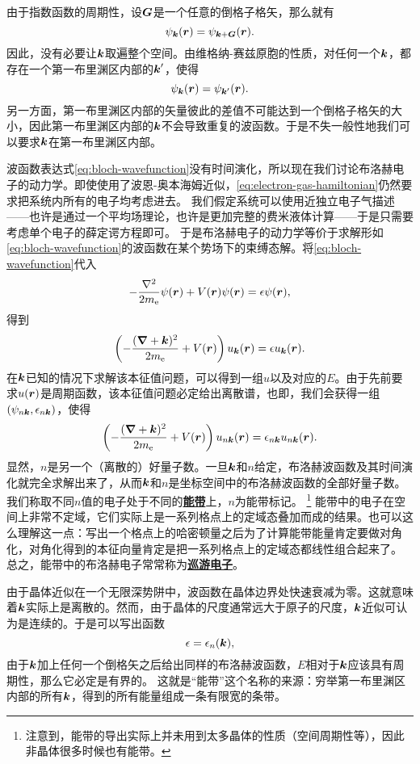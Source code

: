 \documentclass[hyperref, UTF8, a4paper]{ctexart}
\newcommand*{\concept}[1]{\underline{\textbf{#1}}}
\begin{document}
由于指数函数的周期性，设$\vb*{G}$是一个任意的倒格子格矢，那么就有
\[
    \psi_{\vb*{k}}(\vb*{r}) = \psi_{\vb*{k}+\vb*{G}}(\vb*{r}).
\]
因此，没有必要让$\vb*{k}$取遍整个空间。由维格纳-赛兹原胞的性质，对任何一个$\vb*{k}$，都存在一个第一布里渊区内部的$\vb*{k}'$，使得
\[
    \psi_{\vb*{k}}(\vb*{r}) = \psi_{\vb*{k}'}(\vb*{r}).
\]
另一方面，第一布里渊区内部的矢量彼此的差值不可能达到一个倒格子格矢的大小，因此第一布里渊区内部的$\vb*{k}$不会导致重复的波函数。于是不失一般性地我们可以要求$\vb*{k}$在第一布里渊区内部。

波函数表达式\eqref{eq:bloch-wavefunction}没有时间演化，所以现在我们讨论布洛赫电子的动力学。即使使用了波恩-奥本海姆近似，\eqref{eq:electron-gas-hamiltonian}仍然要求把系统内所有的电子均考虑进去。
我们假定系统可以使用近独立电子气描述——也许是通过一个平均场理论，也许是更加完整的费米液体计算——于是只需要考虑单个电子的薛定谔方程即可。
于是布洛赫电子的动力学等价于求解形如\eqref{eq:bloch-wavefunction}的波函数在某个势场下的束缚态解。将\eqref{eq:bloch-wavefunction}代入
\[
    -\frac{\laplacian}{2m_\text{e}} \psi(\vb*{r}) + V(\vb*{r}) \psi(\vb*{r}) = \epsilon \psi(\vb*{r}),
\]
得到
\begin{equation}
    \left( - \frac{(\grad+\vb*{k})^2}{2m_\text{e}} + V(\vb*{r}) \right) u_{\vb*{k}}(\vb*{r}) = \epsilon u_{\vb*{k}}(\vb*{r}).
    \label{eq:block-energy-problem}
\end{equation}
在$\vb*{k}$已知的情况下求解该本征值问题，可以得到一组$u$以及对应的$E$。由于先前要求$u(\vb*{r})$是周期函数，该本征值问题必定给出离散谱，也即，我们会获得一组$(\psi_{n \vb*{k}}, \epsilon_{n \vb*{k}})$，使得
\begin{equation}
    \left( - \frac{(\grad+\vb*{k})^2}{2m_\text{e}} + V(\vb*{r}) \right) u_{n \vb*{k}}(\vb*{r}) = \epsilon_{n \vb*{k}} u_{n \vb*{k}}(\vb*{r}).
\end{equation}
显然，$n$是另一个（离散的）好量子数。一旦$\vb*{k}$和$n$给定，布洛赫波函数及其时间演化就完全求解出来了，从而$\vb*{k}$和$n$是坐标空间中的布洛赫波函数的全部好量子数。我们称取不同$n$值的电子处于不同的\concept{能带}上，$n$为能带标记。%
\footnote{注意到，能带的导出实际上并未用到太多晶体的性质（空间周期性等），因此非晶体很多时候也有能带。}%
能带中的电子在空间上非常不定域，它们实际上是一系列格点上的定域态叠加而成的结果。也可以这么理解这一点：写出一个格点上的哈密顿量之后为了计算能带能量肯定要做对角化，对角化得到的本征向量肯定是把一系列格点上的定域态都线性组合起来了。
总之，能带中的布洛赫电子常常称为\concept{巡游电子}。

由于晶体近似在一个无限深势阱中，波函数在晶体边界处快速衰减为零。这就意味着$\vb*{k}$实际上是离散的。然而，由于晶体的尺度通常远大于原子的尺度，$\vb*{k}$近似可认为是连续的。于是可以写出函数
\[
    \epsilon = \epsilon_n(\vb*{k}),
\]
由于$\vb*{k}$加上任何一个倒格矢之后给出同样的布洛赫波函数，$E$相对于$\vb*{k}$应该具有周期性，那么它必定是有界的。
这就是“能带”这个名称的来源：穷举第一布里渊区内部的所有$\vb*{k}$，得到的所有能量组成一条有限宽的条带。
\end{document}
